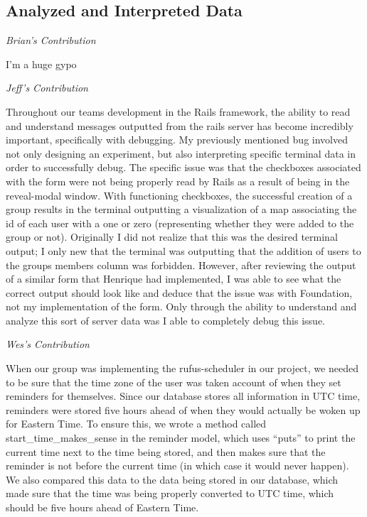 \documentclass[11pt]{article}
\begin{document}
\subsection{Analyzed and Interpreted Data}

\textit{Brian's Contribution}

I'm a huge gypo

\textit{Jeff's Contribution}

Throughout our teams development in the Rails framework, the ability to read and understand messages outputted from the rails server has become incredibly important, specifically with debugging.  My previously mentioned bug involved not only designing an experiment, but also interpreting specific terminal data in order to successfully debug.  The specific issue was that the checkboxes associated with the form were not being properly read by Rails as a result of being in the reveal-modal window.  With functioning checkboxes, the successful creation of a group results in the terminal outputting a visualization of a map associating the id of each user with a one or zero (representing whether they were added to the group or not).  Originally I did not realize that this was the desired terminal output; I only new that the terminal was outputting that the addition of users to the groups members column was forbidden.  However, after reviewing the output of a similar form that Henrique had implemented, I was able to see what the correct output should look like and deduce that the issue was with Foundation, not my implementation of the form.  Only through the ability to understand and analyze this sort of server data was I able to completely debug this issue.

\textit{Wes's Contribution}

When our group was implementing the rufus-scheduler in our project, we needed to be sure that the time zone of the user was taken account of when they set reminders for themselves.  Since our database stores all information in UTC time, reminders were stored five hours ahead of when they would actually be woken up for Eastern Time.  To ensure this, we wrote a method called start_time_makes_sense in the reminder model, which uses “puts” to print the current time next to the time being stored, and then makes sure that the reminder is not before the current time (in which case it would never happen).  We also compared this data to the data being stored in our database, which made sure that the time was being properly converted to UTC time, which should be five hours ahead of Eastern Time.
\end{document}
